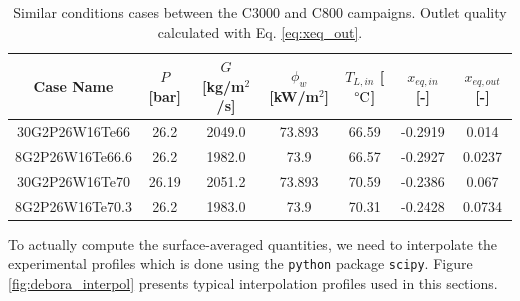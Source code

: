 \begin{table}[!h]
\centering

\begin{tabular}{c||c|c|c|c|c|c}
Case Name & $P$ [bar] & $G$ [kg/m$^{2}$/s]  & $\phi_{w}$ [kW/m$^{2}$]& $T_{L,in}$ [$\degree\mathrm{C}$] & $x_{eq,in}$ [-] & $x_{eq,out}$ [-] \\
\hline
\hline
30G2P26W16Te66  &  26.2  &  2049.0  &  73.893  &  66.59  &  -0.2919  &  0.014 \\
8G2P26W16Te66.6  &  26.2  &  1982.0  &  73.9  &  66.57  &  -0.2927  &  0.0237 \\
\hline 
30G2P26W16Te70  &  26.19  &  2051.2  &  73.893  &  70.59  &  -0.2386  &  0.067 \\
8G2P26W16Te70.3  &  26.2  &  1983.0  &  73.9  &  70.31  &  -0.2428  &  0.0734 \\
\end{tabular}

\caption{Similar conditions cases between the C3000 and C800 campaigns. Outlet quality calculated with Eq. \ref{eq:xeq_out}.}
\label{tab:debora_match_C8C30}
\end{table}


To actually compute the surface-averaged quantities, we need to interpolate the experimental profiles which is done using the \texttt{python} package \texttt{scipy}. Figure \ref{fig:debora_interpol} presents typical interpolation profiles used in this sections.


